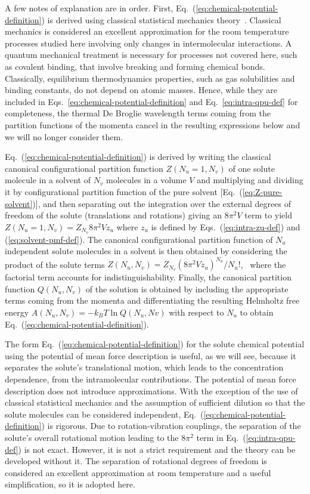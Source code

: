 \documentclass[9pt,bestpractices]{livecoms}
\begin{document}
A few notes of explanation are in order. First, Eq.~(\ref{eq:chemical-potential-definition}) is derived using classical statistical mechanics theory~\cite{hill1986statthermo}. Classical mechanics is considered an excellent approximation for the room temperature processes studied here involving only changes in intermolecular interactions. A quantum mechanical treatment is necessary for processes not covered here, such as covalent binding, that involve breaking and forming chemical bonds. Classically, equilibrium thermodynamics properties, such as gas solubilities and binding constants, do not depend on atomic masses. Hence, while they are included in Eqs.~\ref{eq:chemical-potential-definition} and Eq.~\ref{eq:intra-qpu-def} for completeness, the thermal De Broglie wavelength terms coming from the partition functions of the momenta cancel in the resulting expressions below and we will no longer consider them.

Eq.~(\ref{eq:chemical-potential-definition}) is derived by writing the classical canonical configurational partition function $Z(N_u = 1, N_v)$ of one solute molecule in a solvent of $N_v$ molecules in a volume $V$ and multiplying and dividing it by configurational partition function of the pure solvent [Eq.~(\ref{eq:Z-pure-solvent})], and then separating out the integration over the external degrees of freedom of the solute (translations and rotations) giving an $8 \pi^2 V$ term to yield $Z(N_u = 1, N_v) = Z_{N_v} 8 \pi^2 V z_u$ where $z_u$ is defined by Eqs.~(\ref{eq:intra-zu-def}) and (\ref{eq:solvent-pmf-def}). The canonical configurational partition function of $N_u$ independent solute molecules in a solvent is then obtained by considering the product of the solute terms $Z(N_u, N_v) = Z_{N_v} (8 \pi^2 V z_u)^{N_u}/N_u!$,~\cite{guggenheim1952mixtures504,simonson2016physical} where the factorial term accounts for indistinguishability. Finally, the canonical partition function $Q(N_u, N_v)$ of the solution is obtained by including the appropriate terms coming from the momenta and differentiating the resulting Helmholtz free energy $A(N_u, N_v) = -k_B T \ln Q(N_u, Nv)$ with respect to $N_u$ to obtain Eq.~(\ref{eq:chemical-potential-definition}).

The form Eq.~(\ref{eq:chemical-potential-definition}) for the solute chemical potential using the potential of mean force description is useful, as we will see, because it separates the solute's translational motion, which leads to the concentration dependence, from the intramolecular contributions. The potential of mean force description does not introduce approximations. With the exception of the use of classical statistical mechanics and the assumption of sufficient dilution so that the solute molecules can be considered independent, Eq.~(\ref{eq:chemical-potential-definition}) is rigorous. Due to rotation-vibration couplings, the separation of the solute's overall rotational motion leading to the $8 \pi^2$ term in Eq.~(\ref{eq:intra-qpu-def}) is not exact. However, it is not a strict requirement and the theory can be developed without it. The separation of rotational degrees of freedom is considered an excellent approximation at room temperature and a useful simplification, so it is adopted here.
\end{document}
